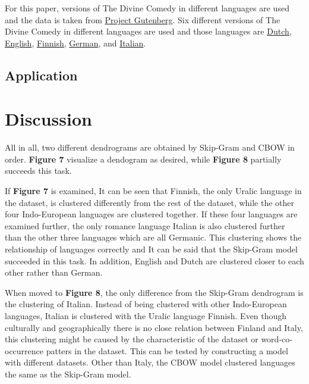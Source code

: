 \documentclass[man]{apa7}
\begin{document}
For this paper, versions of The Divine Comedy in different languages are used and the data is taken from \href{https://www.gutenberg.org/}{Project Gutenberg}. Six different versions of The Divine Comedy in different languages are used and those languages are \href{https://www.gutenberg.org/cache/epub/39181/pg39181-images.html}{Dutch}, \href{https://www.gutenberg.org/cache/epub/1004/pg1004-images.html}{English}, \href{https://www.gutenberg.org/cache/epub/12546/pg12546.html}{Finnish}, \href{https://www.gutenberg.org/cache/epub/8085/pg8085.html}{German}, and \href{https://www.gutenberg.org/cache/epub/1000/pg1000-images.html}{Italian}.

\subsection{Application}



\section{Discussion}
All in all, two different dendrograms are obtained by Skip-Gram and CBOW in order. \textbf{Figure 7} visualize a dendogram as desired, while \textbf{Figure 8} partially succeeds this task.

If \textbf{Figure 7} is examined, It can be seen that Finnish, the only Uralic language in the dataset, is clustered differently from the rest of the dataset, while the other four Indo-European languages are clustered together. If these four languages are examined further, the only romance language Italian is also clustered further than the other three languages which are all Germanic. This clustering shows the relationship of languages correctly and It can be said that the Skip-Gram model succeeded in this task. In addition, English and Dutch are clustered closer to each other rather than German.

When moved to \textbf{Figure 8}, the only difference from the Skip-Gram dendrogram is the clustering of Italian. Instead of being clustered with other Indo-European languages, Italian is clustered with the Uralic language Finnish. Even though culturally and geographically there is no close relation between Finland and Italy, this clustering might be caused by the characteristic of the dataset or word-co-occurrence patters in the dataset. This can be tested by constructing a model with different datasets. Other than Italy, the CBOW model clustered languages the same as the Skip-Gram model.
\end{document}
